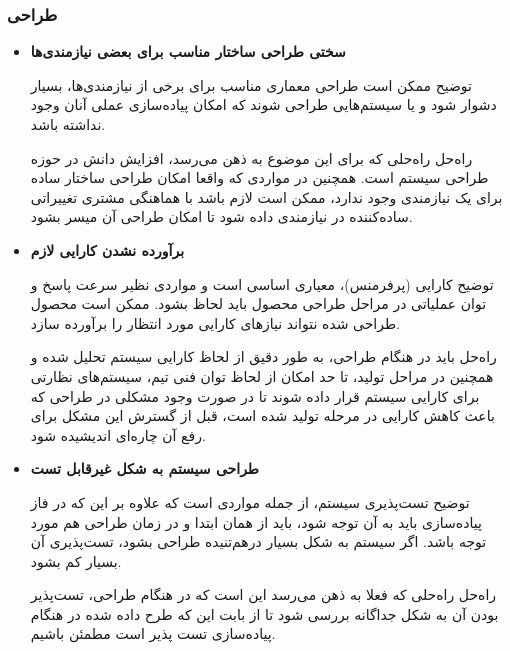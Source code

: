 \subsubsection{طراحی}


\begin{itemize}
	\item 
	\textbf{سختی طراحی ساختار مناسب برای بعضی نیازمندی‌ها}
	
	توضیح \hspace*{1cm} 
	ممکن است طراحی معماری مناسب برای برخی از نیازمندی‌ها، بسیار دشوار شود و یا سیستم‌هایی طراحی شوند که امکان پیاده‌سازی عملی آنان وجود نداشته باشد.
	
		
	راه‌حل \hspace*{1cm} 
	راه‌حلی که برای این موضوع به ذهن می‌رسد، افزایش دانش در حوزه طراحی سیستم است. همچنین در مواردی که واقعا امکان طراحی ساختار ساده برای یک نیازمندی وجود ندارد، ممکن است لازم باشد با هماهنگی مشتری تغییراتی ساده‌کننده در نیازمندی داده شود تا امکان طراحی آن میسر بشود.
	
	
	
		\item 
	\textbf{برآورده نشدن کارایی لازم}
	
	
		توضیح \hspace*{1cm} 
	کارایی (پرفرمنس)، معیاری اساسی است و مواردی نظیر سرعت پاسخ و توان عملیاتی در مراحل طراحی محصول باید لحاظ بشود. ممکن است محصول طراحی شده نتواند نیازهای کارایی مورد انتظار را برآورده سازد.
	
	راه‌حل \hspace*{1cm} 
	باید در هنگام طراحی، به طور دقیق از لحاظ کارایی سیستم تحلیل شده و همچنین در مراحل تولید، تا حد امکان از لحاظ توان فنی تیم، سیستم‌های نظارتی برای کارایی سیستم قرار داده شوند تا در صورت وجود مشکلی در طراحی که باعث کاهش کارایی در مرحله تولید شده است، قبل از گسترش این مشکل برای رفع آن چاره‌ای اندیشیده شود.
	
	
	\item
	\textbf{طراحی سیستم به شکل غیرقابل تست}
	
	
	توضیح \hspace*{1cm} 
	تست‌پذیری سیستم، از جمله مواردی است که علاوه بر این که در فاز پیاده‌سازی باید به آن توجه شود، باید از همان ابتدا و در زمان طراحی هم مورد توجه باشد. اگر سیستم به شکل بسیار در‌هم‌تنیده طراحی بشود، تست‌پذیری آن بسیار کم بشود.
	
	
	راه‌حل \hspace*{1cm} 
	راه‌حلی که فعلا به ذهن می‌رسد این است که در هنگام طراحی، تست‌پذیر بودن آن به شکل جداگانه بررسی شود تا از بابت این که طرح داده شده در هنگام پیاده‌سازی تست پذیر است مطمئن باشیم.
	
	
	
\end{itemize}

